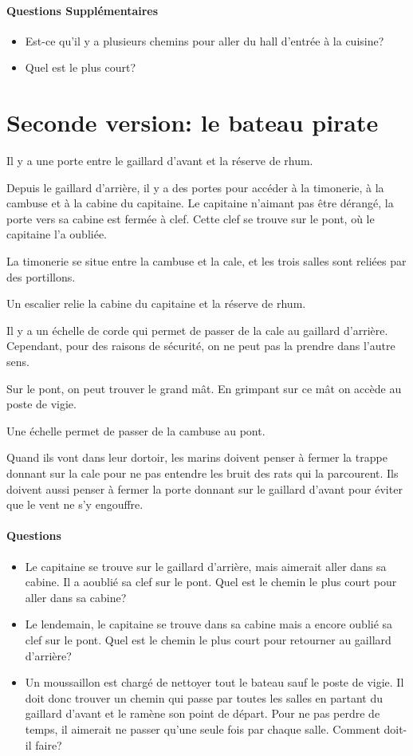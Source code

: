 \documentclass{article}
\begin{document}
\paragraph{Questions Supplémentaires}
\begin{itemize}
\item Est-ce qu'il y a plusieurs chemins pour aller du hall d'entrée à la cuisine?
\item Quel est le plus court?
\end{itemize}

\newpage
\section{Seconde version: le bateau pirate}

Il y a une porte entre le gaillard d'avant et la réserve de rhum.

Depuis le gaillard d'arrière, il y a des portes pour accéder à la timonerie, à la cambuse et à la cabine du capitaine.
Le capitaine n'aimant pas être dérangé, la porte vers sa cabine est fermée à clef. Cette clef se trouve sur le pont, où le capitaine l'a oubliée.

La timonerie se situe entre la cambuse et la cale, et les trois salles sont reliées par des portillons.

Un escalier relie la cabine du capitaine et la réserve de rhum.

Il y a un échelle de corde qui permet de passer de la cale au gaillard d'arrière. Cependant, pour des raisons de sécurité, on ne peut pas la prendre dans l'autre sens.

Sur le pont, on peut trouver le grand mât. En grimpant sur ce mât on accède au poste de vigie.

Une échelle permet de passer de la cambuse au pont.

Quand ils vont dans leur dortoir, les marins doivent penser à fermer la trappe donnant sur la cale pour ne pas entendre les bruit des rats qui la parcourent. Ils doivent aussi penser à fermer la porte donnant sur le gaillard d'avant pour éviter que le vent ne s'y engouffre.


\paragraph{Questions}
\begin{itemize}
\item Le capitaine se trouve sur le gaillard d'arrière, mais aimerait aller dans sa cabine. Il a aoublié sa clef sur le pont. Quel est le chemin le plus court pour aller dans sa cabine?
\item Le lendemain, le capitaine se trouve dans sa cabine mais a encore oublié sa clef sur le pont. Quel est le chemin le plus court pour retourner au gaillard d'arrière?
\item Un moussaillon est chargé de nettoyer tout le bateau sauf le poste de vigie. Il doit donc trouver un chemin qui passe par toutes les salles en partant du gaillard d'avant et le ramène son point de départ. Pour ne pas perdre de temps, il aimerait ne passer qu'une seule fois par chaque salle. Comment doit-il faire?
\end{itemize}
\end{document}
